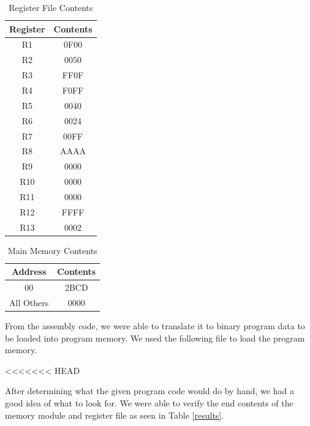 	\begin{table}[htbp]
	   \caption{Register File Contents}
	   \label{regfi}
	   \centering
	   \begin{tabular}{ c | c }
	   Register         & Contents    \\
	   \hline
	   R1  &   0F00        \\
       R2  &   0050        \\
       R3  &   FF0F        \\
       R4  &   F0FF        \\
       R5  &   0040        \\
       R6  &   0024        \\
       R7  &   00FF        \\
       R8  &   AAAA        \\
       R9  &   0000        \\
       R10 &   0000        \\
       R11 &   0000        \\
       R12 &   FFFF        \\
       R13 &   0002        \\
	   \end{tabular}
	\end{table}
    \begin{table}[htbp]
       \caption{Main Memory Contents}
       \label{mainme}
       \centering
       \begin{tabular}{ c | c }
       Address         & Contents    \\
       \hline
       00  &   2BCD        \\
       All Others  &   0000        \\
       
       \end{tabular}
    \end{table}
    
    From the assembly code, we were able to translate it to binary program data 
    to be loaded into program memory. We used the following file to load the program memory.
    
<<<<<<< HEAD
    
    After determining what the given program code would do by hand, we had a good idea of
    what to look for. We were able to verify the end contents of the memory module and register file as seen in Table \ref{results}.
    
    
    
